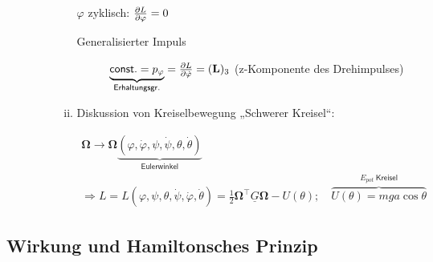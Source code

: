 \begin{enumerate}
\begin{description}
\begin{enumerate}[i)]
$\varphi$ zyklisch: $\frac{\partial L}{\partial \varphi} = 0$

\begin{description}
\item[Generalisierter Impuls]
  $ \underbrace{\mathsf{const.} =
    p_{\varphi}}_{\mathclap{\mathsf{Erhaltungsgr.}}}  =
  \pdiff{L}{\dot{\varphi}} = (\mathbf{L})_3 $ (z-Komponente des Drehimpulses)

\end{description}

\item Diskussion von Kreiselbewegung „Schwerer Kreisel“:

\begin{align*}
  \mathbf{\Omega} \rightarrow \mathbf{\Omega} \underbrace{ \left(
  \varphi, \dot{\varphi}, \psi, \dot{\psi}, \theta, \dot{\theta}
  \right)}_{\mathsf{Eulerwinkel}}\\
  \Rightarrow L = L \left(
  \varphi, \psi, \theta, \dot{\psi}, \dot{\varphi}, \dot{\theta}
  \right) = \frac{1}{2} \mathbf{\Omega}^{\top} \underline{G} \mathbf{\Omega}
  - U(\theta);
  \quad \overbrace{U(\theta) = mga\cos\theta}^{E_{pot}\:\mathsf{Kreisel}}
\end{align*}


\end{enumerate}

\end{description}

\end{enumerate}


\subsection{Wirkung und Hamiltonsches Prinzip}

